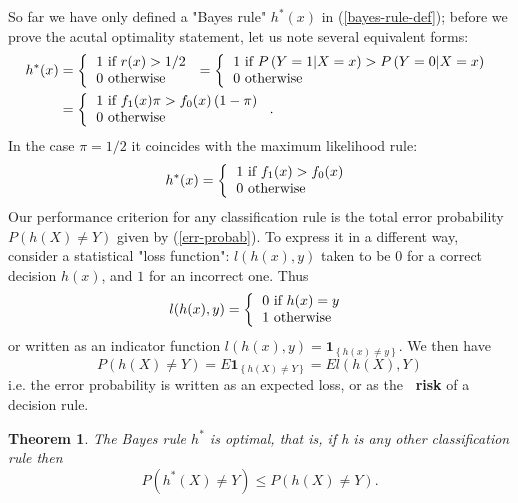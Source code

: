 \documentclass[11pt,twoside]{article}%
\theoremstyle{change}
\newtheorem{theorem}{Theorem}[section]
\begin{document}
So far we have only defined a "Bayes rule" $h^{\ast}(x)$ in
(\ref{bayes-rule-def}); before we prove the acutal optimality statement, let
us note several equivalent forms:
\begin{align*}
h^{\ast}(x)  & =\left\{
\begin{tabular}
[c]{l}%
$1$ if $r(x)>1/2$\\
$0$ otherwise
\end{tabular}
\right.  =\left\{
\begin{tabular}
[c]{l}%
$1$ if $P\left(  Y=1|X=x\right)  >P\left(  Y=0|X=x\right)  $\\
$0$ otherwise
\end{tabular}
\right. \\
& =\left\{
\begin{tabular}
[c]{l}%
$1$ if $f_{1}(x)\pi>f_{0}(x)\left(  1-\pi\right)  $\\
$0$ otherwise
\end{tabular}
\right.  .
\end{align*}
In the case $\pi=1/2$ it coincides with the maximum likelihood rule:
\[
h^{\ast}(x)=\left\{
\begin{tabular}
[c]{l}%
$1$ if $f_{1}(x)>f_{0}(x)$\\
$0$ otherwise
\end{tabular}
\right.
\]
Our performance criterion for any classification rule is the total error
probability $P\left(  h(X)\neq Y\right)  $ given by (\ref{err-probab}). To
express it in a different way, consider a statistical "loss function":
$l(h(x),y)$ taken to be $0$ for a correct decision $h(x)$, and $1$ for an
incorrect one. Thus
\[
l(h(x),y)=\left\{
\begin{tabular}
[c]{l}%
$0$ if $h(x)=y$\\
$1$ otherwise
\end{tabular}
\right.
\]
or written as an indicator function $l(h(x),y)=\mathbf{1}_{\left\{  h(x)\neq
y\right\}  }$. We then have
\[
P\left(  h(X)\neq Y\right)  =E\mathbf{1}_{\left\{  h(X)\neq Y\right\}
}=El(h(X),Y)
\]
i.e. the error probability is written as an expected loss, or as the
\textbf{\ risk} of a decision rule.

\begin{theorem}
\label{theor-bayes-rule}The Bayes rule $h^{\ast}$ is optimal, that is, if h is
any other classification rule then
\[
P\left(  h^{\ast}(X)\neq Y\right)  \leq P\left(  h(X)\neq Y\right)  .
\]

\end{theorem}
\end{document}

